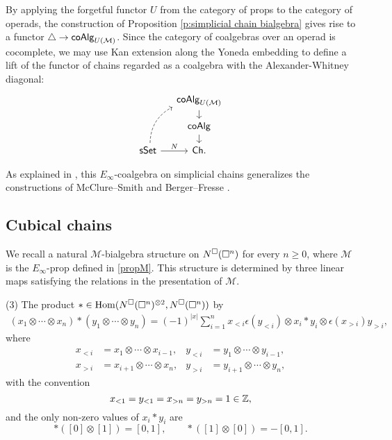 By applying the forgetful functor $U$ from the category of props to the category of operads, the construction of Proposition \ref{p:simplicial chain bialgebra} gives rise to a functor $\triangle \to \mathsf{coAlg}_{U(\mathcal{M})}$. Since the category of coalgebras over an operad is cocomplete, we may use Kan extension along the Yoneda embedding to define a lift of the functor of chains regarded as a coalgebra with the Alexander-Whitney diagonal:
\begin{equation*}
\begin{tikzcd}[column sep=small, row sep=small]
& \coAlg_{U(\M)} \arrow[d] \\
& \coAlg \arrow[d] \\
\sSet \arrow[r, "N"] \arrow[dashed, uur, bend left]& \Ch.
\end{tikzcd}
\end{equation*}

As explained in \cite{medina2020prop1}, this $E_\infty$-coalgebra on simplicial chains generalizes the constructions of McClure--Smith \cite{mcclure2003multivariable} and Berger--Fresse \cite{berger2004combinatorial}.

\subsection{Cubical chains}

We recall a natural $\mathcal M$-bialgebra structure on $N^{\square}(\square^n)$ for every $n \geq 0$, where $\mathcal M$ is the $E_{\infty}$-prop defined in \ref{propM}. This structure is determined by three linear maps satisfying the relations in the presentation of $\mathcal M$.


(3) The product $\ast \in \mathrm{Hom}(N^{\square}(\square^n)^{\otimes 2}, N^{\square}(\square^n))$ by
\begin{align*}
(x_1 \otimes \cdots \otimes x_n) \ast (y_1 \otimes \cdots \otimes y_n) =
(-1)^{|x|} \sum_{i=1}^n x_{<i} \epsilon(y_{<i}) \otimes x_i \ast y_i \otimes \epsilon(x_{>i})y_{>i},
\end{align*}
where
\begin{align*}
x_{<i} & = x_1 \otimes \cdots \otimes x_{i-1}, &
y_{<i} & = y_1 \otimes \cdots \otimes y_{i-1}, \\
x_{>i} & = x_{i+1} \otimes \cdots \otimes x_n, & 
y_{>i} & = y_{i+1} \otimes \cdots \otimes y_n,
\end{align*}
with the convention
\begin{equation*}
x_{<1} = y_{<1} = x_{>n} = y_{>n} = 1 \in \mathbb{Z},
\end{equation*}
and the only non-zero values of $x_i \ast y_i$ are
\begin{equation*}
\ast([0] \otimes [1]) = [0, 1], \qquad  \ast([1] \otimes [0]) = -[0, 1].
\end{equation*}

